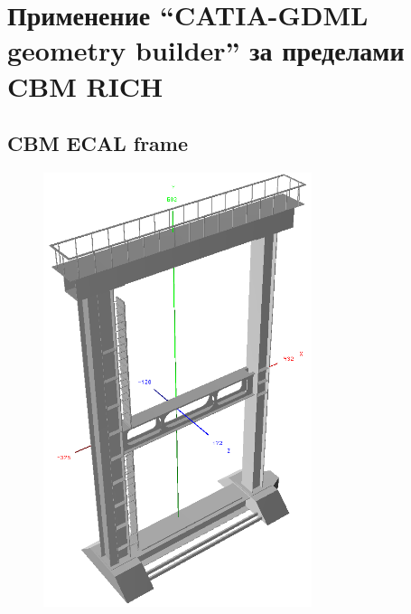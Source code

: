 \section{Применение ``CATIA-GDML geometry builder'' за пределами CBM RICH}\label{sec:secBuilderOtherUsage}


\subsection{CBM ECAL frame}\label{sec:secCbmEcalFrame}


\begin{figure}[H]
\centering
\includegraphics[width=0.7\textwidth]{pictures/CBM_ECAL_frame.png}
\caption{}
\label{fig:CbmEcalFrame}
\end{figure}


